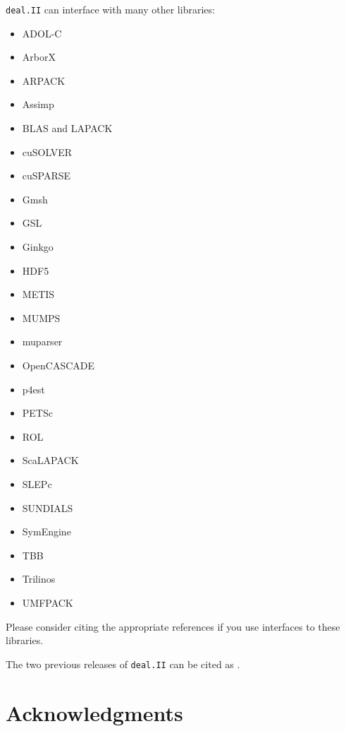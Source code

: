 \documentclass{ansarticle-preprint}
\newcommand{\specialword}[1]{\texttt{#1}}
\newcommand{\dealii}{{\specialword{deal.II}}\xspace}
\begin{document}
\dealii{} can interface with many other libraries:
\begin{multicols}{3}
  \begin{itemize}
    \item ADOL-C \cite{Griewank1996a,adol-c}
    \item ArborX \cite{lebrun2020arborx}
    \item ARPACK \cite{arpack}
    \item Assimp \cite{assimp}
    \item BLAS and LAPACK \cite{lapack}
    \item cuSOLVER \cite{cusolver}
    \item cuSPARSE \cite{cusparse}
    \item Gmsh \cite{geuzaine2009gmsh}
    \item GSL \cite{gsl2016}
    \item Ginkgo \cite{ginkgo-web-page}
    \item HDF5 \cite{hdf5}
    \item METIS \cite{karypis1998fast}
    \item MUMPS \cite{ADE00,MUMPS:1,MUMPS:2,mumps-web-page}
    \item muparser \cite{muparser-web-page}
    \item OpenCASCADE \cite{opencascade-web-page}
    \item p4est \cite{p4est}
    \item PETSc \cite{petsc-user-ref,petsc-web-page}
    \item ROL \cite{ridzal2014rapid}
    \item ScaLAPACK \cite{slug}
    \item SLEPc \cite{Hernandez:2005:SSF}
    \item SUNDIALS \cite{sundials}
    \item SymEngine \cite{symengine-web-page}
    \item TBB \cite{Rei07}
    \item Trilinos \cite{trilinos,trilinos-web-page}
    \item UMFPACK \cite{umfpack}
  \end{itemize}
\end{multicols}
Please consider citing the appropriate references if you use
interfaces to these libraries. 

The two previous releases of \dealii{} can be cited as
\cite{dealII92,dealII93}.


\section{Acknowledgments}
\end{document}
